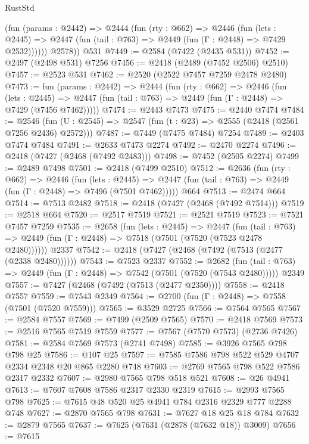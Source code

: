 \begin{lexlean}{RustStd}
\begin{coremodule}
          (fun (params : @2442) =>
          @2444
            (fun (rty : @662) =>
            @2446
              (fun (lets : @2445) =>
              @2447 (fun (tail : @763) => @2449 (fun (Γ : @2448) => @7429 @2532))))))
        @2578))
    @531
@7449 := @2584 (@7422 (@2435 @531))
@7452 := @2497 (@2498 @531) @7256
@7456 := @2418 (@2489 (@7452 @2506) @2510)
@7457 := @2523 @531
@7462 := @2520 (@2522 @7457 @7259 @2478 @2480)
@7473 := fun (params : @2442) =>
  @2444
    (fun (rty : @662) =>
    @2446
      (fun (lets : @2445) =>
      @2447 (fun (tail : @763) => @2449 (fun (Γ : @2448) => @7429 (@7456 @7462)))))
@7474 := @2443 @7473
@7475 := @2440 @7474
@7484 := @2546 (fun (U : @2545) => @2547 (fun (t : @23) => @2555 (@2418 (@2561 @7256 @2436) @2572)))
@7487 := @7449 (@7475 @7484) @7254
@7489 := @2403 @7474 @7484
@7491 := @2633 @7473 @2274
@7492 := @2470 @2274
@7496 := @2418 (@7427 (@2468 (@7492 @2483)))
@7498 := @7452 (@2505 @2274)
@7499 := @2489 @7498
@7501 := @2418 (@7499 @2510)
@7512 := @2636
    (fun (rty : @662) =>
    @2446
      (fun (lets : @2445) =>
      @2447 (fun (tail : @763) => @2449 (fun (Γ : @2448) => @7496 (@7501 @7462)))))
    @664
@7513 := @2474 @664
@7514 := @7513 @2482
@7518 := @2418 (@7427 (@2468 (@7492 @7514)))
@7519 := @2518 @664
@7520 := @2517 @7519
@7521 := @2521 @7519
@7523 := @7521 @7457 @7259
@7535 := @2658
    (fun (lets : @2445) =>
    @2447
      (fun (tail : @763) => @2449 (fun (Γ : @2448) => @7518 (@7501 (@7520 (@7523 @2478 @2480))))))
    @2337
@7542 := @2418 (@7427 (@2468 (@7492 (@7513 (@2477 (@2338 @2480))))))
@7543 := @7523 @2337
@7552 := @2682
    (fun (tail : @763) => @2449 (fun (Γ : @2448) => @7542 (@7501 (@7520 (@7543 @2480)))))
    @2349
@7557 := @7427 (@2468 (@7492 (@7513 (@2477 @2350))))
@7558 := @2418 @7557
@7559 := @7543 @2349
@7564 := @2700 (fun (Γ : @2448) => @7558 (@7501 (@7520 @7559)))
@7565 := @3529 @2725
@7566 := @7564 @7565
@7567 := @2584 @7557
@7569 := @7499 (@2509 @7565)
@7570 := @2418 @7569
@7573 := @2516 @7565 @7519 @7559
@7577 := @7567 (@7570 @7573) (@2736 @7426)
@7581 := @2584 @7569 @7573 (@2741 @7498)
@7585 := @3926 @7565 @798 @798 @25
@7586 := @107 @25
@7597 := @7585 @7586 @798 @522 @529 @4707 @2334 @2348 @20 @865 @2280 @748
@7603 := @2769 @7565 @798 @522 @7586 @2317 @2332
@7607 := @2980 @7565 @798 @518 @521
@7608 := @26 @4941
@7613 := @7607 @7608 @7586 @2317 @2330 @2319
@7615 := @2993 @7565 @798
@7625 := @7615 @48 @520 @25 @4941 @784 @2316 @2329 @777 @2288 @748
@7627 := @2870 @7565 @798
@7631 := @7627 @18 @25 @18 @784
@7632 := @2879 @7565
@7637 := @7625 (@7631 (@2878 (@7632 @18)) @3009)
@7656 := @7615

\end{coremodule}
\end{lexlean}
